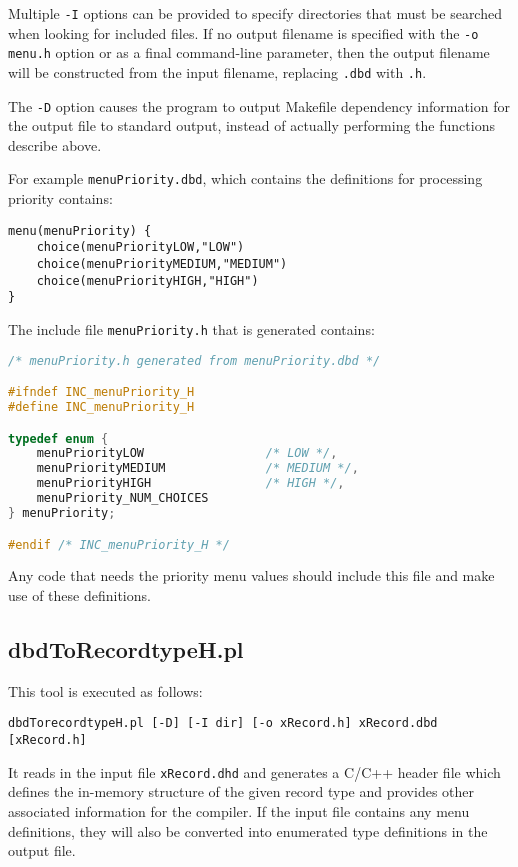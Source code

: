 Multiple \verb|-I| options can be provided to specify directories that must be searched when looking for included files.
If no output filename is specified with the \verb|-o menu.h| option or as a final command-line parameter, then the output filename will be constructed from the input filename, replacing \verb|.dbd| with \verb|.h|.

The \verb|-D| option causes the program to output Makefile dependency information for the output file to standard output, instead of actually performing the functions describe above.

For example \verb|menuPriority.dbd|, which contains the definitions for processing priority contains:

\begin{lstlisting}[language=dbd]
menu(menuPriority) {
    choice(menuPriorityLOW,"LOW")
    choice(menuPriorityMEDIUM,"MEDIUM")
    choice(menuPriorityHIGH,"HIGH")
}
\end{lstlisting}

The include file \verb|menuPriority.h| that is generated contains:

\begin{lstlisting}[language=C]
/* menuPriority.h generated from menuPriority.dbd */

#ifndef INC_menuPriority_H
#define INC_menuPriority_H

typedef enum {
    menuPriorityLOW                 /* LOW */,
    menuPriorityMEDIUM              /* MEDIUM */,
    menuPriorityHIGH                /* HIGH */,
    menuPriority_NUM_CHOICES
} menuPriority;

#endif /* INC_menuPriority_H */
\end{lstlisting}

Any code that needs the priority menu values should include this file and make use of these definitions.

\subsection{dbdToRecordtypeH.pl}

This tool is executed as follows:

\begin{lstlisting}[language=dbd]
dbdTorecordtypeH.pl [-D] [-I dir] [-o xRecord.h] xRecord.dbd [xRecord.h]
\end{lstlisting}

It reads in the input file \verb|xRecord.dhd| and generates a C/C++ header file which defines the in-memory structure of the given record type and provides other associated information for the compiler.
If the input file contains any menu definitions, they will also be converted into enumerated type definitions in the output file.

